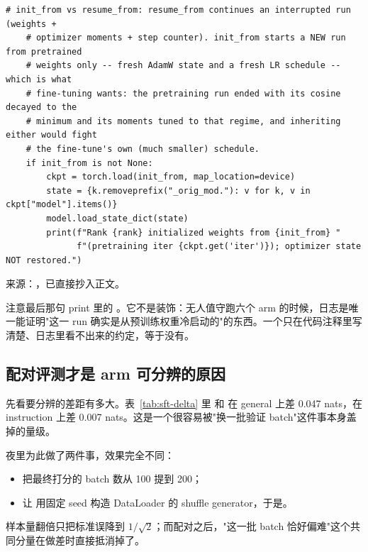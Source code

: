 \begin{lstlisting}[style=hlnum, firstnumber=343]
    # init_from vs resume_from: resume_from continues an interrupted run (weights +
    # optimizer moments + step counter). init_from starts a NEW run from pretrained
    # weights only -- fresh AdamW state and a fresh LR schedule -- which is what
    # fine-tuning wants: the pretraining run ended with its cosine decayed to the
    # minimum and its moments tuned to that regime, and inheriting either would fight
    # the fine-tune's own (much smaller) schedule.
    if init_from is not None:
        ckpt = torch.load(init_from, map_location=device)
        state = {k.removeprefix("_orig_mod."): v for k, v in ckpt["model"].items()}
        model.load_state_dict(state)
        print(f"Rank {rank} initialized weights from {init_from} "
              f"(pretraining iter {ckpt.get('iter')}); optimizer state NOT restored.")
\end{lstlisting}
\noindent 来源：，已直接抄入正文。

注意最后那句 print 里的 。它不是装饰：无人值守跑六个 arm 的时候，日志是唯一能证明"这一 run 确实是从预训练权重冷启动的"的东西。一个只在代码注释里写清楚、日志里看不出来的约定，等于没有。

\subsection{配对评测才是 arm 可分辨的原因}
\label{sec:b-sft-paired}

先看要分辨的差距有多大。表~\ref{tab:sft-delta} 里  和  在 general 上差 0.047 nats，在 instruction 上差 0.007 nats。这是一个很容易被"换一批验证 batch"这件事本身盖掉的量级。

夜里为此做了两件事，效果完全不同：

\begin{itemize}[leftmargin=1.5em]
  \item 把最终打分的 batch 数从 100 提到 200；
  \item 让  用固定 seed 构造 DataLoader 的 shuffle generator，于是。
\end{itemize}

 样本量翻倍只把标准误降到 $1/\sqrt{2}$；而配对之后，"这一批 batch 恰好偏难"这个共同分量在做差时直接抵消掉了。

